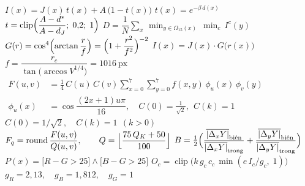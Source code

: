 \documentclass[border=1.5pt,multi=eqn]{standalone}
\newenvironment{eqn}[1]{\fontsize{18}{22}\selectfont\color[HTML]{#1}$\displaystyle}{$}
\begin{document}
\begin{eqn}{0E2238}I(x)=J(x)\,t(x)+A\,\bigl(1-t(x)\bigr)\end{eqn}
\begin{eqn}{0E2238}t(x)=e^{-\beta\,d(x)}\end{eqn}
\begin{eqn}{0E2238}t=\operatorname{clip}\Bigl(\dfrac{A-d^{*}}{A-d_J};\;0{,}2;\;1\Bigr)\end{eqn}
\begin{eqn}{0E2238}D=\dfrac{1}{N}\sum_{x}\,\min_{y\in\Omega_{15}(x)}\,\min_{c}\,I^{c}(y)\end{eqn}
\begin{eqn}{0E2238}G(r)=\cos^{4}\Bigl(\arctan\dfrac{r}{f}\Bigr)=\Bigl(1+\dfrac{r^{2}}{f^{2}}\Bigr)^{-2}\end{eqn}
\begin{eqn}{0E2238}I(x)=J(x)\cdot G\bigl(r(x)\bigr)\end{eqn}
\begin{eqn}{0E2238}f=\dfrac{r_c}{\tan\bigl(\arccos V^{1/4}\bigr)}=1016\ \text{px}\end{eqn}
\begin{eqn}{0E2238}\begin{aligned}F(u,v)&=\tfrac14\,C(u)\,C(v)\sum_{x=0}^{7}\sum_{y=0}^{7}f(x,y)\,\phi_u(x)\,\phi_v(y)\\ \phi_u(x)&=\cos\dfrac{(2x+1)u\pi}{16},\quad C(0)=\tfrac{1}{\sqrt{2}},\ \ C(k)=1\end{aligned}\end{eqn}
\begin{eqn}{0E2238}C(0)=1/\sqrt{2},\quad C(k)=1\ \ (k>0)\end{eqn}
\begin{eqn}{0E2238}F_q=\operatorname{round}\dfrac{F(u,v)}{Q(u,v)},\qquad Q=\Bigl\lfloor\dfrac{75\,Q_K+50}{100}\Bigr\rfloor\end{eqn}
\begin{eqn}{0E2238}B=\tfrac12\Bigl(\dfrac{\overline{|\Delta_x Y|}_{\text{biên}}}{\overline{|\Delta_x Y|}_{\text{trong}}}+\dfrac{\overline{|\Delta_y Y|}_{\text{biên}}}{\overline{|\Delta_y Y|}_{\text{trong}}}\Bigr)\end{eqn}
\begin{eqn}{0E2238}P(x)=\bigl[R-G>25\bigr]\wedge\bigl[B-G>25\bigr]\end{eqn}
\begin{eqn}{0E2238}O_c=\operatorname{clip}\bigl(k\,g_c\,c_c\,\min(e\,I_c/g_c,\;1)\bigr)\end{eqn}
\begin{eqn}{0E2238}g_R=2{,}13,\quad g_B=1{,}812,\quad g_G=1\end{eqn}
\end{document}

